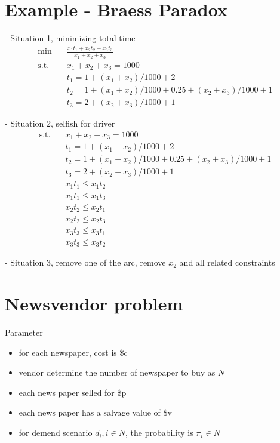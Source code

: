 			\section{Example - Braess Paradox}

			- Situation 1, minimizing total time
			\begin{align}
				\min \quad & \frac{x_1t_1 + x_2t_2 + x_3t_3}{x_1 + x_2 + x_3}\\
				\text{s.t.} \quad & x_1 + x_2 + x_3 = 1000\\
				                  & t_1 = 1 + (x_1 + x_2) / 1000 + 2\\
				                  & t_2 = 1 + (x_1 + x_2) / 1000 + 0.25 + (x_2 + x_3)/1000 + 1\\
				                  & t_3 = 2 + (x_2 + x_3) / 1000 + 1
			\end{align}

			- Situation 2, selfish for driver
			\begin{align}
				\text{s.t.} \quad & x_1 + x_2 + x_3 = 1000\\
				                  & t_1 = 1 + (x_1 + x_2) / 1000 + 2\\
				                  & t_2 = 1 + (x_1 + x_2) / 1000 + 0.25 + (x_2 + x_3)/1000 + 1\\
				                  & t_3 = 2 + (x_2 + x_3) / 1000 + 1\\
				                  & x_1 t_1 \le x_1 t_2 \\
				                  & x_1 t_1 \le x_1 t_3 \\
				                  & x_2 t_2 \le x_2 t_1 \\
				                  & x_2 t_2 \le x_2 t_3 \\
				                  & x_3 t_3 \le x_3 t_1 \\
				                  & x_3 t_3 \le x_3 t_2
			\end{align}

			- Situation 3, remove one of the arc, remove $x_2$ and all related constraints

		\section{Newsvendor problem}
			Parameter
			\begin{itemize}
				\item for each newspaper, cost is \$c
				\item vendor determine the number of newspaper to buy as $N$
				\item each news paper selled for \$p
				\item each news paper has a salvage value of \$v
				\item for demend scenario $d_i, i\in N$, the probability is $\pi_i \in N$
			\end{itemize}

